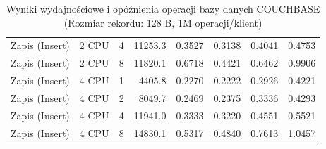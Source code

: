 \begin{table}[ht]
{\begin{tabular}{llcrrrrr}
Zapis (Insert) & 2 CPU & 4 & 11253.3 & 0.3527 & 0.3138 & 0.4041 & 0.4753 \\
Zapis (Insert) & 2 CPU & 8 & 11820.1 & 0.6718 & 0.4421 & 0.6462 & 0.9906 \\
Zapis (Insert) & 4 CPU & 1 & 4405.8 & 0.2270 & 0.2222 & 0.2926 & 0.4221 \\
Zapis (Insert) & 4 CPU & 2 & 8049.7 & 0.2469 & 0.2375 & 0.3336 & 0.4293 \\
Zapis (Insert) & 4 CPU & 4 & 11941.0 & 0.3333 & 0.3220 & 0.4551 & 0.5521 \\
Zapis (Insert) & 4 CPU & 8 & 14830.1 & 0.5317 & 0.4840 & 0.7613 & 1.0457 \\
\bottomrule
\end{tabular}%
}
\caption{Wyniki wydajnościowe i opóźnienia operacji bazy danych COUCHBASE (Rozmiar rekordu: 128 B, 1M operacji/klient)}
\label{tab:latency_couchbase_small_1000000}
\end{table}

